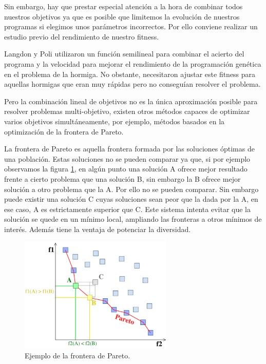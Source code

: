 Sin embargo, hay que prestar especial atención a la hora de combinar todos nuestros objetivos ya que es posible
que limitemos la evolución de nuestros programas si elegimos unos parámetros incorrectos. Por ello conviene
realizar un estudio previo del rendimiento de nuestro fitness.

Langdon y Poli \cite{LangdonPoli:1998} utilizaron un función semilineal para
combinar el acierto del programa y la velocidad para mejorar el rendimiento de la programación genética en el problema de la hormiga. No obstante, necesitaron
ajustar este fitness para aquellas hormigas que eran muy rápidas pero no conseguían resolver el problema.

Pero la combinación lineal de objetivos no es la única aproximación posible para resolver problemas
multi-objetivo, existen otros métodos capaces de optimizar varios objetivos simultáneamente, por ejemplo,
métodos basados en la optimización de la frontera de Pareto.

La frontera de Pareto es aquella frontera formada por las soluciones óptimas de una población. Estas soluciones
no se pueden comparar ya que, si por ejemplo observamos la figura
\ref{fig:pareto}, en algún punto una solución A ofrece mejor resultado frente a cierto problema que una solución B, sin embargo la B ofrece mejor solución a otro problema que la A. Por ello no se pueden comparar.
Sin embargo puede existir una solución C cuyas soluciones sean peor que la dada por la A, en ese caso, A es
estrictamente superior que C. Este sistema intenta evitar que la solución se quede en un mínimo local, ampliando
las fronteras a otros mínimos de interés. Además tiene la ventaja de potenciar la diversidad.

\begin{figure}[t]
\centering
\includegraphics[width=0.65\textwidth]{figs/pareto}
\caption{Ejemplo de la frontera de Pareto.}
\label{fig:pareto}
\end{figure}

